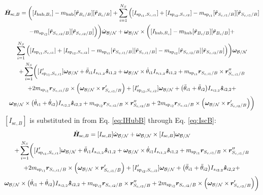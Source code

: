 \documentclass[paper]{aiaaNew}
\begin{document}
	\begin{multline}
	\dot{\bm{H}}_{\text{sc},B} = \bigg([I_{\text{hub},B_c}]  - m_{\text{hub}} [\tilde{\bm{r}}_{B_c/B}] [\tilde{\bm{r}}_{B_c/B}] + 
	\sum\limits_{i=1}^{N_S} \Big([I_{\text{sp}_{i1},S_{c,i1}}]+ [I_{\text{sp}_{i2},S_{c,i2}}] - m_{\text{sp}_{i1}} [\tilde{\bm{r}}_{S_{c,i1}/B}] [\tilde{\bm{r}}_{S_{c,i1}/B}] \\
	- m_{\text{sp}_{i2}} [\tilde{\bm{r}}_{S_{c,i2}/B}] [\tilde{\bm{r}}_{S_{c,i2}/B}]   \Big)\bigg)\dot{\bm\omega}_{\cal B/N}	+ \bm\omega_{\cal B/N} \times \bigg([I_{\text{hub},B_c}] - m_{\text{hub}} [\tilde{\bm{r}}_{B_c/B}] [\tilde{\bm{r}}_{B_c/B}] + \\
	\sum\limits_{i=1}^{N_S}\Big(  [I_{\text{sp}_{i1},S_{c,i1}}]+ [I_{\text{sp}_{i2},S_{c,i2}}] - m_{\text{sp}_{i1}} [\tilde{\bm{r}}_{S_{c,i1}/B}] [\tilde{\bm{r}}_{S_{c,i1}/B}] - m_{\text{sp}_{i2}} [\tilde{\bm{r}}_{S_{c,i2}/B}] [\tilde{\bm{r}}_{S_{c,i2}/B}]  \Big) \bigg) \bm\omega_{\cal B/N} \\ 
	+\sum\limits_{i=1}^{N_S} \biggl( [I'_{\text{sp}_{i1},S_{c,i1}}] \bm\omega_{\cal B/N} 
	+ \ddot{\theta}_{i1} I_{s_{i1,2}}\bm{\hat{s}}_{i1,2}+ \bm\omega_{\cal B/N} \times \dot{\theta}_{i1} I_{s_{i1,2}}\bm{\hat{s}}_{i1,2}	+m_{\text{sp}_{i1}} \bm{r}_{S_{c,i1}/B} \times \bm{r}''_{S_{c,i1}/B} \\
	+ 2 m_{\text{sp}_{i1}} \bm{r}_{S_{c,i1}/B} \times \Big( \bm\omega_{\cal B/N} \times \bm{r}'_{S_{c,i1}/B}\Big)	+ [I'_{\text{sp}_{i2},S_{c,i2}}] \bm\omega_{\cal B/N} 
	+ \big(\ddot{\theta}_{i1} + \ddot{\theta}_{i2}\big) I_{s_{i2,2}}\bm{\hat{s}}_{i2,2}+ \\
	\bm\omega_{\cal B/N} \times \big(\dot{\theta}_{i1} + \dot{\theta}_{i2}\big) I_{s_{i2,2}}\bm{\hat{s}}_{i2,2}
	+m_{\text{sp}_{i2}} \bm{r}_{S_{c,i2}/B} \times \bm{r}''_{S_{c,i2}/B} + 2 m_{\text{sp}_{i2}} \bm{r}_{S_{c,i2}/B} \times \Big(\bm\omega_{\cal B/N} \times \bm{r}'_{S_{c,i2}/B}\Big)\biggr)
	\label{eq:Hbdot17}
	\end{multline}
	$[I_{\text{sc},B}]$ is substituted in from Eq. \ref{eq:IHubB} through Eq. \ref{eq:IscB}:
	\begin{multline}
	\dot{\bm{H}}_{\text{sc},B} = [I_{\text{sc},B}]\dot{\bm\omega}_{\cal B/N}	+ \bm\omega_{\cal B/N} \times [I_{\text{sc},B}] \bm\omega_{\cal B/N} \\ 
	+\sum\limits_{i=1}^{N_S} \biggl( [I'_{\text{sp}_{i1},S_{c,i1}}] \bm\omega_{\cal B/N} 
	+ \ddot{\theta}_{i1} I_{s_{i1,2}}\bm{\hat{s}}_{i1,2}+ \bm\omega_{\cal B/N} \times \dot{\theta}_{i1} I_{s_{i1,2}}\bm{\hat{s}}_{i1,2}	+m_{\text{sp}_{i1}} \bm{r}_{S_{c,i1}/B} \times \bm{r}''_{S_{c,i1}/B} \\
	+ 2 m_{\text{sp}_{i1}} \bm{r}_{S_{c,i1}/B} \times \Big( \bm\omega_{\cal B/N} \times \bm{r}'_{S_{c,i1}/B}\Big)	+ [I'_{\text{sp}_{i2},S_{c,i2}}] \bm\omega_{\cal B/N} 
	+ \big(\ddot{\theta}_{i1} + \ddot{\theta}_{i2}\big) I_{s_{i2,2}}\bm{\hat{s}}_{i2,2}+ \\
	\bm\omega_{\cal B/N} \times \big(\dot{\theta}_{i1} + \dot{\theta}_{i2}\big) I_{s_{i2,2}}\bm{\hat{s}}_{i2,2}
	+m_{\text{sp}_{i2}} \bm{r}_{S_{c,i2}/B} \times \bm{r}''_{S_{c,i2}/B} + 2 m_{\text{sp}_{i2}} \bm{r}_{S_{c,i2}/B} \times \Big(\bm\omega_{\cal B/N} \times \bm{r}'_{S_{c,i2}/B}\Big)\biggr)
	\label{eq:Hbdot18}
	\end{multline}
\end{document}
